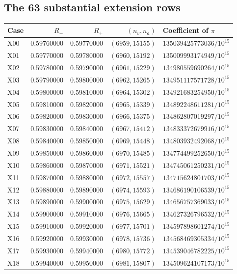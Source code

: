 \documentclass[11pt]{article}
\theoremstyle{remark}\newtheorem{remark}[theorem]{Remark}
\begin{document}
\subsection{The 63 substantial extension rows}
\begin{longtable}{@{}lrrrl@{}}
\toprule
Case & $R_-$ & $R_+$ & $(n_v,n_a)$ & Coefficient of $\pi$\\
\midrule\endhead
X00 & 0.59760000 & 0.59770000 & $(6959,15155)$ & $135039425773036/10^{15}$\\
X01 & 0.59770000 & 0.59780000 & $(6960,15192)$ & $135009993174949/10^{15}$\\
X02 & 0.59780000 & 0.59790000 & $(6961,15229)$ & $134980559690264/10^{15}$\\
X03 & 0.59790000 & 0.59800000 & $(6962,15265)$ & $134951117571728/10^{15}$\\
X04 & 0.59800000 & 0.59810000 & $(6964,15302)$ & $134921683254950/10^{15}$\\
X05 & 0.59810000 & 0.59820000 & $(6965,15339)$ & $134892248611281/10^{15}$\\
X06 & 0.59820000 & 0.59830000 & $(6966,15375)$ & $134862807019297/10^{15}$\\
X07 & 0.59830000 & 0.59840000 & $(6967,15412)$ & $134833372679916/10^{15}$\\
X08 & 0.59840000 & 0.59850000 & $(6969,15448)$ & $134803932492068/10^{15}$\\
X09 & 0.59850000 & 0.59860000 & $(6970,15485)$ & $134774499252650/10^{15}$\\
X10 & 0.59860000 & 0.59870000 & $(6971,15521)$ & $134745061250231/10^{15}$\\
X11 & 0.59870000 & 0.59880000 & $(6972,15557)$ & $134715624801703/10^{15}$\\
X12 & 0.59880000 & 0.59890000 & $(6974,15593)$ & $134686190106539/10^{15}$\\
X13 & 0.59890000 & 0.59900000 & $(6975,15629)$ & $134656757369033/10^{15}$\\
X14 & 0.59900000 & 0.59910000 & $(6976,15665)$ & $134627326796532/10^{15}$\\
X15 & 0.59910000 & 0.59920000 & $(6977,15701)$ & $134597898601274/10^{15}$\\
X16 & 0.59920000 & 0.59930000 & $(6978,15736)$ & $134568469305334/10^{15}$\\
X17 & 0.59930000 & 0.59940000 & $(6980,15772)$ & $134539046782225/10^{15}$\\
X18 & 0.59940000 & 0.59950000 & $(6981,15807)$ & $134509624107173/10^{15}$\\

\end{longtable}
\end{document}
